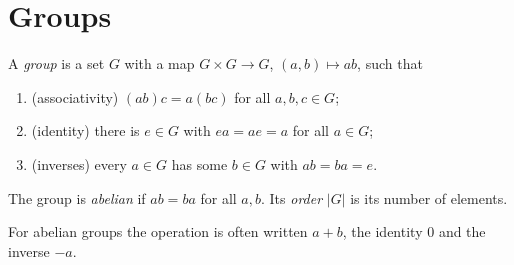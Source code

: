 \section{Groups}

\begin{definition}\label{def:group}
A \emph{group} is a set $G$ with a map $G\times G\to G$, $(a,b)\mapsto ab$, such that
\begin{enumerate}[label=(\roman*)]
\item (associativity) $(ab)c=a(bc)$ for all $a,b,c\in G$;
\item (identity) there is $e\in G$ with $ea=ae=a$ for all $a\in G$;
\item (inverses) every $a\in G$ has some $b\in G$ with $ab=ba=e$.
\end{enumerate}
The group is \emph{abelian} if $ab=ba$ for all $a,b$. Its \emph{order} $|G|$ is its number of elements.
\end{definition}

For abelian groups the operation is often written $a+b$, the identity $0$ and the inverse $-a$.

